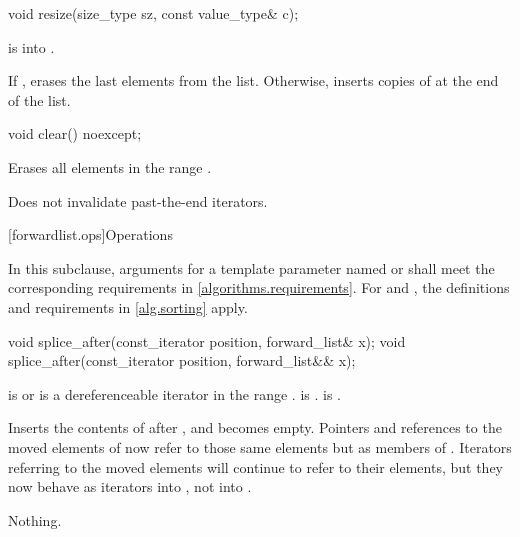 \begin{itemdecl}
void resize(size_type sz, const value_type& c);
\end{itemdecl}

\begin{itemdescr}
\pnum
\expects
{} is  into .

\pnum
\effects
If , erases the last  elements from the list. Otherwise, inserts 
copies of  at the end of the list.
\end{itemdescr}


%
\begin{itemdecl}
void clear() noexcept;
\end{itemdecl}

\begin{itemdescr}
\pnum
\effects
Erases all elements in the range .

\pnum
\remarks
Does not invalidate past-the-end iterators.
\end{itemdescr}

[forwardlist.ops]{Operations}

\pnum
In this subclause,
arguments for a template parameter
named  or 
shall meet the corresponding requirements in \ref{algorithms.requirements}.
For  and ,
the definitions and requirements in \ref{alg.sorting} apply.

%
\begin{itemdecl}
void splice_after(const_iterator position, forward_list& x);
void splice_after(const_iterator position, forward_list&& x);
\end{itemdecl}

\begin{itemdescr}
\pnum
\expects
{} is  or is a dereferenceable
iterator in the range .
 is .
 is .

\pnum
\effects
Inserts the contents of  after
, and  becomes empty. Pointers and references to the moved
elements of  now refer to those same elements but as members of .
Iterators referring to the moved elements will continue to refer to their elements, but
they now behave as iterators into , not into .

\pnum
\throws
Nothing.

\pnum
\complexity
{}
\end{itemdescr}

